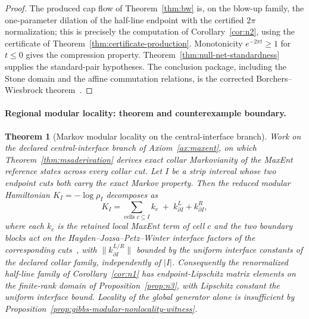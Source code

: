 \documentclass[11pt]{article}
\newtheorem{theorem}{Theorem}[section]
\begin{document}
\begin{proof}
The produced cap flow of Theorem~\ref{thm:bw} is, on the blow-up family, the
one-parameter dilation of the half-line endpoint with the certified \(2\pi\)
normalization; this is precisely the computation of Corollary~\ref{cor:n2},
using the certificate of Theorem~\ref{thm:certificate-production}.
Monotonicity \(e^{-2\pi t}\geq1\) for \(t\leq0\) gives
the compression property. Theorem~\ref{thm:null-net-standardness} supplies the
standard-pair hypotheses. The conclusion package, including the Stone domain
and the affine commutation relations, is the corrected Borchers--Wiesbrock
theorem~\cite{wiesbrock93,arakiZsido05}.
\end{proof}

\paragraph{Regional modular locality: theorem and counterexample boundary.}

\begin{theorem}[Markov modular locality on the central-interface branch]
\label{thm:markov-modular-locality}
Work on the declared central-interface branch of Axiom~\ref{ax:maxent}, on
which Theorem~\ref{thm:msaderivation} derives exact collar Markovianity of the
MaxEnt reference states across every collar cut. Let \(I\) be a strip interval
whose two endpoint cuts both carry the exact Markov property. Then the reduced
modular Hamiltonian \(K_I=-\log\rho_I\) decomposes as
\[
K_I=\sum_{\text{cells } c\subseteq I}k_c \;+\; k^{L}_{\partial I}+k^{R}_{\partial I},
\]
where each \(k_c\) is the retained local MaxEnt term of cell \(c\) and the two
boundary blocks act on the Hayden--Jozsa--Petz--Winter interface factors of
the corresponding cuts~\cite{hjpw04}, with
\(\|k^{L/R}_{\partial I}\|\) bounded by the uniform interface constants of the
declared collar family, independently of \(|I|\). Consequently the
renormalized half-line family of Corollary~\ref{cor:n1} has endpoint-Lipschitz
matrix elements on the finite-rank domain of Proposition~\ref{prop:n3}, with
Lipschitz constant the uniform interface bound. Locality of the \emph{global}
generator alone is insufficient by
Proposition~\ref{prop:gibbs-modular-nonlocality-witness}.
\end{theorem}
\end{document}
